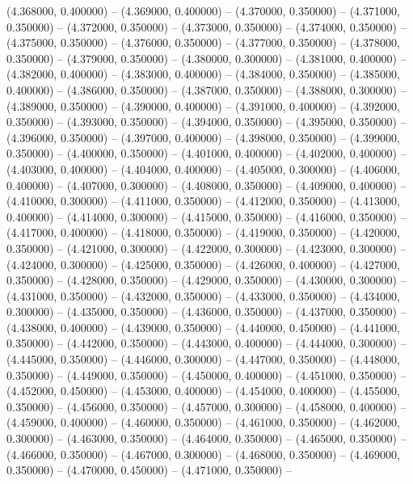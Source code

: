 (4.368000, 0.400000) -- 
(4.369000, 0.400000) -- 
(4.370000, 0.350000) -- 
(4.371000, 0.350000) -- 
(4.372000, 0.350000) -- 
(4.373000, 0.350000) -- 
(4.374000, 0.350000) -- 
(4.375000, 0.350000) -- 
(4.376000, 0.350000) -- 
(4.377000, 0.350000) -- 
(4.378000, 0.350000) -- 
(4.379000, 0.350000) -- 
(4.380000, 0.300000) -- 
(4.381000, 0.400000) -- 
(4.382000, 0.400000) -- 
(4.383000, 0.400000) -- 
(4.384000, 0.350000) -- 
(4.385000, 0.400000) -- 
(4.386000, 0.350000) -- 
(4.387000, 0.350000) -- 
(4.388000, 0.300000) -- 
(4.389000, 0.350000) -- 
(4.390000, 0.400000) -- 
(4.391000, 0.400000) -- 
(4.392000, 0.350000) -- 
(4.393000, 0.350000) -- 
(4.394000, 0.350000) -- 
(4.395000, 0.350000) -- 
(4.396000, 0.350000) -- 
(4.397000, 0.400000) -- 
(4.398000, 0.350000) -- 
(4.399000, 0.350000) -- 
(4.400000, 0.350000) -- 
(4.401000, 0.400000) -- 
(4.402000, 0.400000) -- 
(4.403000, 0.400000) -- 
(4.404000, 0.400000) -- 
(4.405000, 0.300000) -- 
(4.406000, 0.400000) -- 
(4.407000, 0.300000) -- 
(4.408000, 0.350000) -- 
(4.409000, 0.400000) -- 
(4.410000, 0.300000) -- 
(4.411000, 0.350000) -- 
(4.412000, 0.350000) -- 
(4.413000, 0.400000) -- 
(4.414000, 0.300000) -- 
(4.415000, 0.350000) -- 
(4.416000, 0.350000) -- 
(4.417000, 0.400000) -- 
(4.418000, 0.350000) -- 
(4.419000, 0.350000) -- 
(4.420000, 0.350000) -- 
(4.421000, 0.300000) -- 
(4.422000, 0.300000) -- 
(4.423000, 0.300000) -- 
(4.424000, 0.300000) -- 
(4.425000, 0.350000) -- 
(4.426000, 0.400000) -- 
(4.427000, 0.350000) -- 
(4.428000, 0.350000) -- 
(4.429000, 0.350000) -- 
(4.430000, 0.300000) -- 
(4.431000, 0.350000) -- 
(4.432000, 0.350000) -- 
(4.433000, 0.350000) -- 
(4.434000, 0.300000) -- 
(4.435000, 0.350000) -- 
(4.436000, 0.350000) -- 
(4.437000, 0.350000) -- 
(4.438000, 0.400000) -- 
(4.439000, 0.350000) -- 
(4.440000, 0.450000) -- 
(4.441000, 0.350000) -- 
(4.442000, 0.350000) -- 
(4.443000, 0.400000) -- 
(4.444000, 0.300000) -- 
(4.445000, 0.350000) -- 
(4.446000, 0.300000) -- 
(4.447000, 0.350000) -- 
(4.448000, 0.350000) -- 
(4.449000, 0.350000) -- 
(4.450000, 0.400000) -- 
(4.451000, 0.350000) -- 
(4.452000, 0.450000) -- 
(4.453000, 0.400000) -- 
(4.454000, 0.400000) -- 
(4.455000, 0.350000) -- 
(4.456000, 0.350000) -- 
(4.457000, 0.300000) -- 
(4.458000, 0.400000) -- 
(4.459000, 0.400000) -- 
(4.460000, 0.350000) -- 
(4.461000, 0.350000) -- 
(4.462000, 0.300000) -- 
(4.463000, 0.350000) -- 
(4.464000, 0.350000) -- 
(4.465000, 0.350000) -- 
(4.466000, 0.350000) -- 
(4.467000, 0.300000) -- 
(4.468000, 0.350000) -- 
(4.469000, 0.350000) -- 
(4.470000, 0.450000) -- 
(4.471000, 0.350000) -- 
